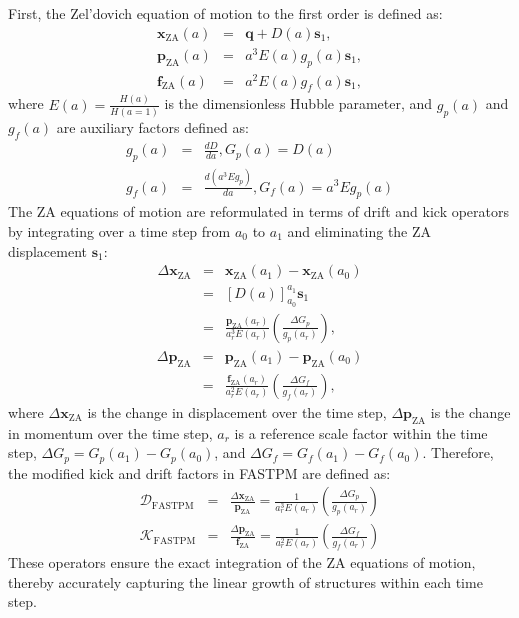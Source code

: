 First, the Zel'dovich equation of motion to the first order is defined as:
\begin{eqnarray}
    \mathbf{x}_{\text{ZA}}(a) &=& \mathbf{q} + D(a)\mathbf{s}_1,  \nonumber \\
    \mathbf{p}_{\text{ZA}}(a) &=& a^3 E(a) g_p(a) \mathbf{s}_1,  \nonumber \\
    \mathbf{f}_{\text{ZA}}(a) &=& a^2 E(a) g_f(a) \mathbf{s}_1, 
\end{eqnarray}
where $E(a) = \frac{H(a)}{H(a=1)}$ is the dimensionless Hubble parameter, and $g_p(a)$ and $g_f(a)$ are auxiliary factors defined as:
\begin{eqnarray}
    g_p(a)  &=& \frac{dD}{da},  G_p(a) = D(a) \\[0.5em]
    g_f(a)  &=& \frac{d(a^3 E g_p)}{da}, G_f(a) = a^3 E g_p(a)
\end{eqnarray}
The ZA equations of motion are reformulated in terms of drift and kick operators by integrating over a time step from $a_0$ to $a_1$ and eliminating the ZA displacement $\mathbf{s}_1$:
\begin{eqnarray}
    \Delta \mathbf{x}_{\text{ZA}} &=& \mathbf{x}_{\text{ZA}}(a_1) - \mathbf{x}_{\text{ZA}}(a_0) \nonumber \\
    &=& \left[ D(a) \right]_{a_0}^{a_1} \mathbf{s}_1 \nonumber \\
    &=& \frac{\mathbf{p}_{\text{ZA}}(a_r)}{a_r^3 E(a_r)} \left( \frac{\Delta G_p}{g_p(a_r)} \right),
\end{eqnarray}
\begin{eqnarray}
    \Delta \mathbf{p}_{\text{ZA}} &=& \mathbf{p}_{\text{ZA}}(a_1) - \mathbf{p}_{\text{ZA}}(a_0) \nonumber \\
    &=& \frac{\mathbf{f}_{\text{ZA}}(a_r)}{a_r^2 E(a_r)} \left( \frac{\Delta G_f}{g_f(a_r)} \right),
\end{eqnarray}
where $\Delta \mathbf{x}_{\text{ZA}}$ is the change in displacement over the time step, $\Delta \mathbf{p}_{\text{ZA}}$ is the change in momentum over the time step, $a_r$ is a reference scale factor within the time step, $\Delta G_p = G_p(a_1) - G_p(a_0)$, and $\Delta G_f = G_f(a_1) - G_f(a_0)$.
Therefore, the modified kick and drift factors in FASTPM are defined as:
\begin{eqnarray}
    \mathcal{D}_{\text{FASTPM}} &=& \frac{\Delta \mathbf{x}_{\text{ZA}}}{\mathbf{p}_{\text{ZA}}} 
        = \frac{1}{a_r^3 E(a_r)} \left( \frac{\Delta G_p}{g_p(a_r)} \right) \\[1em]
    \mathcal{K}_{\text{FASTPM}} &=& \frac{\Delta \mathbf{p}_{\text{ZA}}}{\mathbf{f}_{\text{ZA}}} 
        = \frac{1}{a_r^2 E(a_r)} \left( \frac{\Delta G_f}{g_f(a_r)} \right) 
\end{eqnarray}
These operators ensure the exact integration of the ZA equations of motion, thereby accurately capturing the linear growth of structures within each time step.

